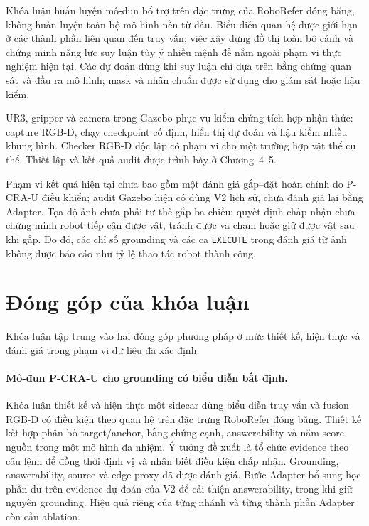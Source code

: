 Khóa luận huấn luyện mô-đun bổ trợ trên đặc trưng của RoboRefer đóng băng, không huấn luyện toàn bộ mô hình nền từ đầu. Biểu diễn quan hệ được giới hạn ở các thành phần liên quan đến truy vấn; việc xây dựng đồ thị toàn bộ cảnh và chứng minh năng lực suy luận tùy ý nhiều mệnh đề nằm ngoài phạm vi thực nghiệm hiện tại. Các dự đoán dùng khi suy luận chỉ dựa trên bằng chứng quan sát và đầu ra mô hình; mask và nhãn chuẩn được sử dụng cho giám sát hoặc hậu kiểm.

UR3, gripper và camera trong Gazebo phục vụ kiểm chứng tích hợp nhận thức: capture RGB-D, chạy checkpoint cố định, hiển thị dự đoán và hậu kiểm nhiều khung hình. Checker RGB-D độc lập có phạm vi cho một trường hợp vật thể cụ thể. Thiết lập và kết quả audit được trình bày ở Chương~4--5.

Phạm vi kết quả hiện tại chưa bao gồm một đánh giá gắp--đặt hoàn chỉnh do P-CRA-U điều khiển; audit Gazebo hiện có dùng V2 lịch sử, chưa đánh giá lại bằng Adapter. Tọa độ ảnh chưa phải tư thế gắp ba chiều; quyết định chấp nhận chưa chứng minh robot tiếp cận được vật, tránh được va chạm hoặc giữ được vật sau khi gắp. Do đó, các chỉ số grounding và các ca \texttt{EXECUTE} trong đánh giá từ ảnh không được báo cáo như tỷ lệ thao tác robot thành công.

\section{Đóng góp của khóa luận}
\label{sec:introduction-contributions}

Khóa luận tập trung vào hai đóng góp phương pháp ở mức thiết kế, hiện thực và đánh giá trong phạm vi dữ liệu đã xác định.

\paragraph{Mô-đun P-CRA-U cho grounding có biểu diễn bất định.}
Khóa luận thiết kế và hiện thực một sidecar dùng biểu diễn truy vấn và fusion RGB-D có điều kiện theo quan hệ trên đặc trưng RoboRefer đóng băng. Thiết kế kết hợp phân bố target/anchor, bằng chứng cạnh, answerability và năm score nguồn trong một mô hình đa nhiệm. Ý tưởng đề xuất là tổ chức evidence theo câu lệnh để đồng thời định vị và nhận biết điều kiện chấp nhận. Grounding, answerability, source và edge proxy đã được đánh giá. Bước Adapter bổ sung học phần dư trên evidence dự đoán của V2 để cải thiện answerability, trong khi giữ nguyên grounding. Hiệu quả riêng của từng nhánh và từng thành phần Adapter còn cần ablation.

